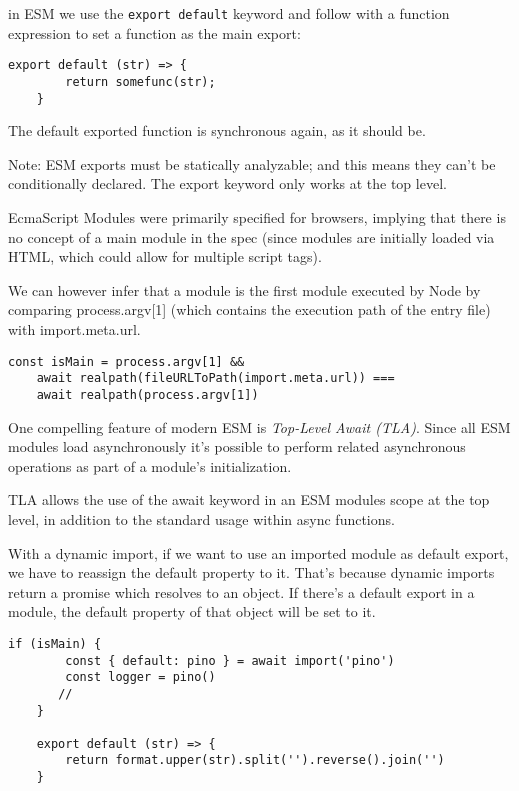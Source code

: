 \documentclass{scrartcl}
\begin{document}
in ESM we use the \lstinline|export default| keyword and follow with a function expression to set a function as the main export:

\begin{lstlisting}[style=ES6]
    export default (str) => {
        return somefunc(str);
    }
\end{lstlisting}

 The default exported function is synchronous again, as it should be.

 Note: ESM exports must be statically analyzable; and this means they can't be conditionally declared. The export keyword only works at the top level.

EcmaScript Modules were primarily specified for browsers, implying that there is no concept of a main module in the spec (since modules are initially loaded via HTML, which could allow for multiple script tags).

We can however infer that a module is the first module executed by Node by comparing process.argv[1] (which contains the execution path of the entry file) with import.meta.url.

\begin{lstlisting}[style=ES6]
    const isMain = process.argv[1] &&
    await realpath(fileURLToPath(import.meta.url)) ===
    await realpath(process.argv[1])
\end{lstlisting}

One compelling feature of modern ESM is \textit{Top-Level Await (TLA)}. Since all ESM modules load asynchronously it's possible to perform related asynchronous operations as part of a module's initialization.

TLA allows the use of the await keyword in an ESM modules scope at the top level, in addition to the standard usage within async functions.

With a dynamic import, if we want to use an imported module as default export, we have to reassign the default property to it. That's because dynamic imports return a promise which resolves to an object.
If there's a default export in a module, the default property of that object will be set to it.

\begin{lstlisting}[style=ES6]
    if (isMain) {
        const { default: pino } = await import('pino')
        const logger = pino()
       //
    }

    export default (str) => {
        return format.upper(str).split('').reverse().join('')
    }
\end{lstlisting}
\end{document}
